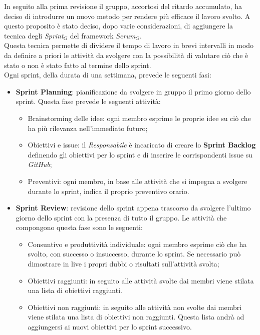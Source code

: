 In seguito alla prima revisione il gruppo, accortosi del ritardo accumulato, ha deciso di introdurre un nuovo metodo per rendere più efficace il lavoro svolto. A questo proposito è stato deciso, dopo varie considerazioni, di aggiungere la tecnica degli \textit{Sprint}$_G$ del framework \textit{Scrum}$_G$.\\
Questa tecnica permette di dividere il tempo di lavoro in brevi intervalli in modo da definire a priori le attività da svolgere con la possibilità di valutare ciò che è stato o non è stato fatto al termine dello sprint.\\
Ogni sprint, della durata di una settimana, prevede le seguenti fasi:
\begin{itemize}
  \item \textbf{Sprint Planning}: pianificazione da svolgere in gruppo il primo giorno dello sprint. Questa fase prevede le seguenti attività:
  \begin{itemize}
    \item Brainstorming delle idee: ogni membro esprime le proprie idee su ciò che ha più rilevanza nell'immediato futuro;
    \item Obiettivi e issue: il \textit{Responsabile} è incaricato di creare lo \textbf{Sprint Backlog} definendo gli obiettivi per lo sprint e di inserire le corrispondenti issue su \textit{GitHub};
    \item Preventivi: ogni membro, in base alle attività che si impegna a svolgere durante lo sprint, indica il proprio preventivo orario.
  \end{itemize}
  \item \textbf{Sprint Review}: revisione dello sprint appena trascorso da svolgere l'ultimo giorno dello sprint con la presenza di tutto il gruppo. Le attività che compongono questa fase sono le seguenti:
  \begin{itemize}
    \item Consuntivo e produttività individuale: ogni membro esprime ciò che ha svolto, con successo o insuccesso, durante lo sprint. Se necessario può dimostrare in live i propri dubbi o risultati sull'attività svolta;
    \item Obiettivi raggiunti: in seguito alle attività svolte dai membri viene stilata una lista di obiettivi raggiunti.
    \item Obiettivi non raggiunti: in seguito alle attività non svolte dai membri viene stilata una lista di obiettivi non raggiunti. Questa lista andrà ad aggiungersi ai nuovi obiettivi per lo sprint successivo.
  \end{itemize}

\end{itemize}
